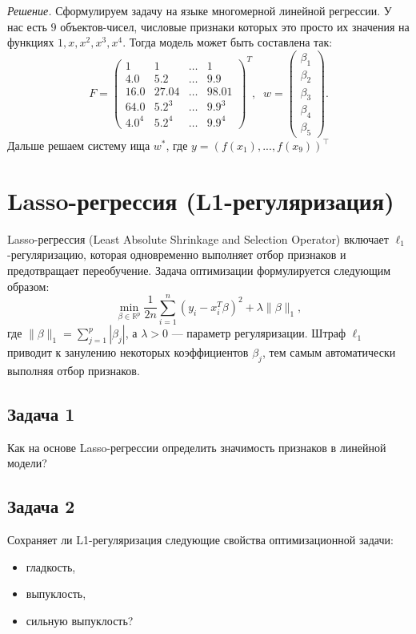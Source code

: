 \noindent\textit{Решение.} Сформулируем задачу на языке многомерной линейной регрессии. У нас есть $9$ объектов-чисел, числовые признаки которых это просто их значения на функциях $1, x, x^2, x^3, x^4$. Тогда модель может быть составлена так:
$$F = \begin{pmatrix}
    1 & 1 & \dots & 1 \\
    4.0 & 5.2 & \dots & 9.9 \\
    16.0 & 27.04 & \dots & 98.01 \\
    64.0 & 5.2^3 & \dots & 9.9^3 \\
    4.0^4 & 5.2^4 & \dots & 9.9^4
\end{pmatrix}^T, \;\; w = \begin{pmatrix}
    \beta_1 \\
    \beta_2 \\
    \beta_3 \\
    \beta_4 \\
    \beta_5
\end{pmatrix}.$$
Дальше решаем систему ища $w^*$, где $y = (f(x_1), ..., f(x_9))^\top$

\section*{Lasso-регрессия (L1-регуляризация)}

Lasso-регрессия (Least Absolute Shrinkage and Selection Operator) включает $\ell_1$-регуляризацию, которая одновременно выполняет отбор признаков и предотвращает переобучение. Задача оптимизации формулируется следующим образом:
\[
\min_{\beta \in \mathbb{R}^p} \frac{1}{2n} \sum_{i=1}^n (y_i - x_i^T \beta)^2 + \lambda \|\beta\|_1,
\]
где $\|\beta\|_1 = \sum_{j=1}^p |\beta_j|$, а $\lambda > 0$ — параметр регуляризации. Штраф $\ell_1$ приводит к занулению некоторых коэффициентов $\beta_j$, тем самым автоматически выполняя отбор признаков.

\subsection*{Задача 1}
Как на основе Lasso-регрессии определить значимость признаков в линейной модели? 

\subsection*{Задача 2}
Сохраняет ли L1-регуляризация следующие свойства оптимизационной задачи:
\begin{itemize}
    \item гладкость,
    \item выпуклость,
    \item сильную выпуклость?
\end{itemize}

